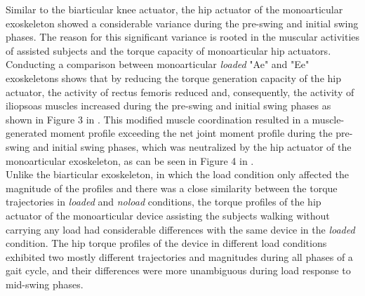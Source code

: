 \documentclass[10pt,letterpaper]{article}
\begin{document}
Similar to the biarticular knee actuator, the hip actuator of the monoarticular exoskeleton showed a considerable variance during the pre-swing and initial swing phases. The reason for this significant variance is rooted in the muscular activities of assisted subjects and the torque capacity of monoarticular hip actuators. Conducting a comparison between monoarticular {\it loaded} "Ae" and "Ee" exoskeletons shows that by reducing the torque generation capacity of the hip actuator, the activity of rectus femoris reduced and, consequently, the activity of iliopsoas muscles increased during the pre-swing and initial swing phases as shown in Figure 3 in . This modified muscle coordination resulted in a muscle-generated moment profile exceeding the net joint moment profile during the pre-swing and initial swing phases, which was neutralized by the hip actuator of the monoarticular exoskeleton, as can be seen in Figure 4 in .\\
Unlike the biarticular exoskeleton, in which the load condition only affected the magnitude of the profiles and there was a close similarity between the torque trajectories in \textit{loaded} and \textit{noload} conditions, the torque profiles of the hip actuator of the monoarticular device assisting the subjects walking without carrying any load had considerable differences with the same device in the \textit{loaded} condition. The hip torque profiles of the device in different load conditions exhibited two mostly different trajectories and magnitudes during all phases of a gait cycle, and their differences were more unambiguous during load response to mid-swing phases.\\
\end{document}
